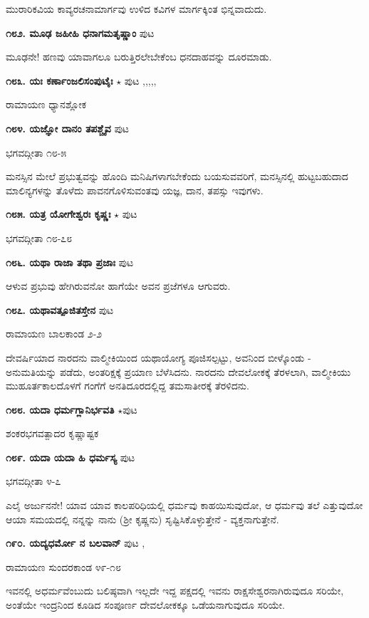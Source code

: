 {ಮುರಾರಿಕವಿಯ ಕಾವ್ಯರಚನಾಮಾರ್ಗವು ಉಳಿದ ಕವಿಗಳ ಮಾರ್ಗಕ್ಕಿಂತ ಭಿನ್ನವಾದುದು.

\medskip
\noindent\textbf{೧೮೨. ಮೂಢ ಜಹೀಹಿ ಧನಾಗಮತೃಷ್ಣಾಂ} \hfill ಪುಟ \pageref{55}

ಮೂಢನೇ! ಹಣವು ಯಾವಾಗಲೂ ಬರುತ್ತಿರಲೇಬೇಕೆಂಬ ಧನದಾಹವನ್ನು ದೂರಮಾಡು.

\medskip
\noindent\textbf{೧೮೩. ಯಃ ಕರ್ಣಾಂಜಲಿಸಂಪುಟೈಃ} $\star$  \hfill ಪುಟ \pageref{152},\pageref{168},\pageref{181},\pageref{208},\pageref{211},\pageref{244}

\hfill ರಾಮಾಯಣ ಧ್ಯಾನಶ್ಲೋಕ 

\medskip
\noindent\textbf{೧೮೪. ಯಜ್ಞೋ ದಾನಂ ತಪಶ್ಚೈವ} \hfill ಪುಟ \pageref{172}

\hfill ಭಗವದ್ಗೀತಾ ೧೮-೫

ಮನಸ್ಸಿನ ಮೇಲೆ ಪ್ರಭುತ್ವವನ್ನು ಹೊಂದಿ ಮನಿಷಿಗಳಾಗಬೇಕೆಂದು ಬಯಸುವವರಿಗೆ, ಮನಸ್ಸಿನಲ್ಲಿ ಹುಟ್ಟಬಹುದಾದ ಮಾಲಿನ್ಯಗಳನ್ನು ತೊಳೆದು ಪಾವನಗೊಳಿಸುವಂತವು ಯಜ್ಞ, ದಾನ, ತಪಸ್ಸು ಇವುಗಳು.

\medskip
\noindent\textbf{೧೮೫. ಯತ್ರ ಯೋಗೇಶ್ವರಃ ಕೃಷ್ಣಃ} $\star$ \hfill ಪುಟ \pageref{92}

\hfill ಭಗವದ್ಗೀತಾ ೧೮-೭೮

\medskip
\noindent\textbf{೧೮೬. ಯಥಾ ರಾಜಾ ತಥಾ ಪ್ರಜಾಃ} \hfill ಪುಟ \pageref{225}

ಆಳುವ ಪ್ರಭುವು ಹೇಗಿರುವನೋ ಹಾಗೆಯೇ ಅವನ ಪ್ರಜೆಗಳೂ ಆಗುವರು.

\medskip
\noindent\textbf{೧೮೭. ಯಥಾವತ್ಪೂಜಿತಸ್ತೇನ} \hfill ಪುಟ \pageref{197}

\hfill ರಾಮಾಯಣ ಬಾಲಕಾಂಡ ೨-೨

ದೇವರ್ಷಿಯಾದ ನಾರದನು ವಾಲ್ಮೀಕಿಯಿಂದ ಯಥಾಯೋಗ್ಯ ಪೂಜಿಸಲ್ಪಟ್ಟು, ಅವನಿಂದ ಬೀಳ್ಕೊಂಡು - ಅನುಮತಿಯನ್ನು ಪಡೆದು, ಅಂತರಿಕ್ಷಕ್ಕೆ ಪ್ರಯಾಣ ಬೆಳೆಸಿದನು. ನಾರದನು ದೇವಲೋಕಕ್ಕೆ  ತೆರಳಲಾಗಿ, ವಾಲ್ಮೀಕಿಯು ಮುಹೂರ್ತಕಾಲದೊಳಗೆ ಗಂಗೆಗೆ ಅನತಿದೂರದಲ್ಲಿದ್ದ ತಮಸಾತೀರಕ್ಕೆ ತೆರಳಿದನು.

\medskip
\noindent\textbf{೧೮೮. ಯದಾ ಧರ್ಮಗ್ಲಾನಿರ್ಭವತಿ} $\star$\hfill ಪುಟ \pageref{150}

\hfill ಶಂಕರಭಗವತ್ಪಾದರ ಕೃಷ್ಣಾಷ್ಟಕ

\medskip
\noindent\textbf{೧೮೯. ಯದಾ ಯದಾ ಹಿ ಧರ್ಮಸ್ಯ} \hfill ಪುಟ \pageref{226}

\hfill ಭಗವದ್ಗೀತಾ ೪-೭

ಎಲೈ ಅರ್ಜುನನೇ! ಯಾವ ಯಾವ ಕಾಲಪರಿಧಿಯಲ್ಲಿ ಧರ್ಮವು ಕಾಹಯಿಸುವುದೋ, ಆ ಧರ್ಮವು ತಲೆ  ಎತ್ತುವುದೋ ಆಯಾ ಸಮಯದಲ್ಲಿ ನನ್ನನ್ನು ನಾನು (ಶ್ರೀ ಕೃಷ್ಣನು) ಸೃಷ್ಟಿಸಿಕೊಳ್ಳುತ್ತೇನೆ - ವ್ಯಕ್ತನಾಗುತ್ತೇನೆ.

\medskip
\noindent\textbf{೧೯೦. ಯದ್ಯಧರ್ಮೋ ನ ಬಲವಾನ್} \hfill ಪುಟ \pageref{192},\pageref{215}

\hfill ರಾಮಾಯಣ ಸುಂದರಕಾಂಡ ೪೯-೧೮

ಇವನಲ್ಲಿ ಅಧರ್ಮವೆಂಬುದು ಬಲಿಷ್ಠವಾಗಿ ಇಲ್ಲದೇ ಇದ್ದ ಪಕ್ಷದಲ್ಲಿ ಇವನು ರಾಕ್ಷಸೇಶ್ವರನಾಗಿರುವುದೂ ಸರಿಯೇ, ಅಂತೆಯೇ ಇಂದ್ರನಿಂದ ಕೂಡಿದ ಸಂಪೂರ್ಣ ದೇವಲೋಕಕ್ಕೂ ಒಡೆಯನಾಗುವುದೂ ಸರಿಯೇ.

}

